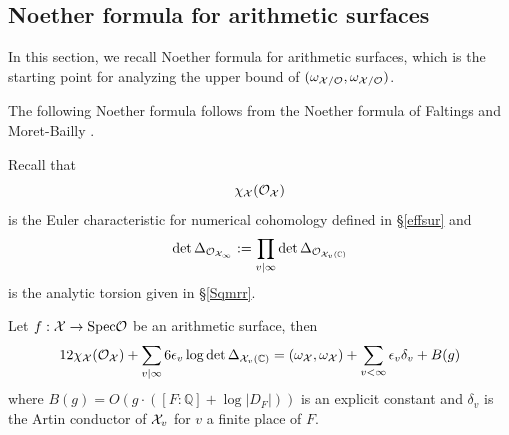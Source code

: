 \documentclass[]{amsart}
\newcommand{\BC}{{\mathbb {C}}} \newcommand{\BD}{{\mathbb {D}}}
\newcommand{\BQ}{{\mathbb {Q}}} \newcommand{\BR}{{\mathbb {R}}}
\newcommand{\CO}{{\mathcal {O}}} \newcommand{\CP}{{\mathcal {P}}}
\newcommand{\Spec}{{\mathrm{Spec}}} \newcommand{\Spf}{{\mathrm{Spf}}}
\newcommand{\ra}{\rightarrow} \newcommand{\imp}{\Longrightarrow}
\theoremstyle{plain}
\theoremstyle{remark} \newtheorem{remark}[thm]{Remark}
\theoremstyle{remark} \newtheorem{exercise}{Exercise}
\theoremstyle{remark} \newtheorem{example}{Example}
\numberwithin{equation}{section}
\begin{document}
\subsection{Noether formula for arithmetic surfaces}

In this section, we recall Noether formula for arithmetic surfaces, which is the starting point for analyzing the upper bound of $(\omega_{\CX/\CO},\omega_{\CX/\CO})$. 

The following Noether formula follows from the Noether formula of Faltings \cite{Faltings} and Moret-Bailly \cite{Moret-Bailly:1989}.


Recall that \[\chi_{\CX}(\CO_\CX)\] is the Euler characteristic for numerical cohomology   defined in \S\ref{effsur} and \[\det \Delta_{\CO_{\CX_\infty}}:=\prod_{v|\infty}\det \Delta_{\CO_{\CX_v(\BC)}}\]is the analytic torsion given in \S\ref{Sqmrr}.
\begin{prop}\label{Noe}
Let $f:\CX\ra \Spec\CO$ be an arithmetic surface, then 
\begin{equation}12\chi_{\CX}(\CO_{\CX})+\sum_{v|\infty}6{\epsilon_v}\log \det \Delta_{\CX_v(\BC)}=(\omega_{\CX},\omega_{\CX})+\sum_{v<\infty}\epsilon_v\delta_v+B(g)\end{equation}where $B(g)=O(g\cdot ([F:\BQ]+\log|D_F|))$ is an explicit constant and $\delta_v$ is the Artin conductor of ${\mathcal {X}}_v$ for $v$ a finite place of $F$.
\end{prop}
\end{document}
